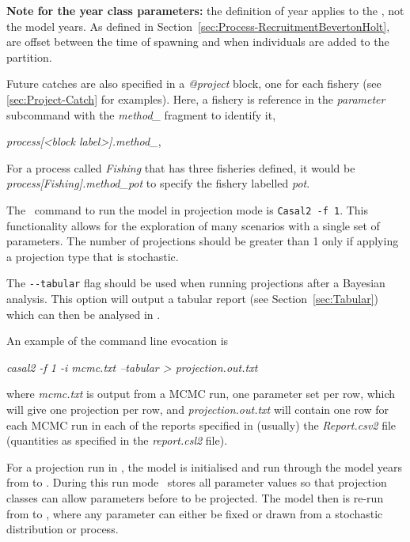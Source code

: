 \textbf{Note for the year class parameters:} the definition of year applies to the , not the model years. As defined in Section~\ref{sec:Process-RecruitmentBevertonHolt},  are offset between the time of spawning and when individuals are added to the partition.

Future catches are also specified in a \textit{@project} block, one for each fishery (see \ref{sec:Project-Catch} for examples). Here, a fishery is reference in the \textit{parameter} subcommand with the \textit{method\_} fragment to identify it,

 \textit{process[<block label>].method\_<fisheries label>},

For a process called \textit{Fishing} that has three fisheries defined, it would be \textit{process[Fishing].method\_pot} to specify the fishery labelled \textit{pot}.

The \CNAME\ command to run the model in projection mode is \texttt{Casal2 -f 1}. \TODO{review; NOT IN MANUAL OR ELSEWHERE]} This functionality allows for the exploration of many scenarios with a single set of parameters. The number of projections should be greater than 1 only if applying a projection type that is stochastic.

The \texttt{-{}-tabular} flag should be used when running projections after a Bayesian analysis. This option will output a tabular report (see Section~\ref{sec:Tabular}) which can then be analysed in \R.

An example of the command line evocation is

\textit{casal2 -f 1 -i mcmc.txt --tabular > projection.out.txt}

where \textit{mcmc.txt} is output from a MCMC run, one parameter set per row, which will give one projection per row, and \textit{projection.out.txt} will contain one row for each MCMC run in each of the reports specified in (usually) the \textit{Report.csv2} file (quantities as specified in the \textit{report.csl2} file).

For a projection run in \CNAME, the model is initialised and run through the model years from  to . During this run mode \CNAME\ stores all parameter values so that projection classes can allow parameters before  to be projected. The model then is re-run from  to , where any parameter can either be fixed or drawn from a stochastic distribution or process.


